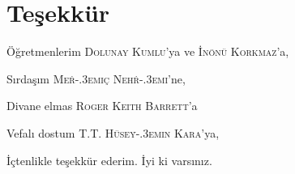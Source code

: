 
\thispagestyle{empty}
\chapter*{Teşekkür}

Öğretmenlerim \textsc{Dolunay Kumlu}'ya ve \textsc{İnönü Korkmaz}'a,

Sırdaşım \textsc{Mer\.{}\kern-.3emiç} \textsc{Nehr\.{}\kern-.3emi}'ne,

Divane elmas \textsc{Roger Keith Barrett}'a

Vefalı dostum \textsc{T.T. Hüsey\.{}\kern-.3emin Kara}'ya,

\vspace{.5cm}

İçtenlikle teşekkür ederim. İyi ki varsınız.
